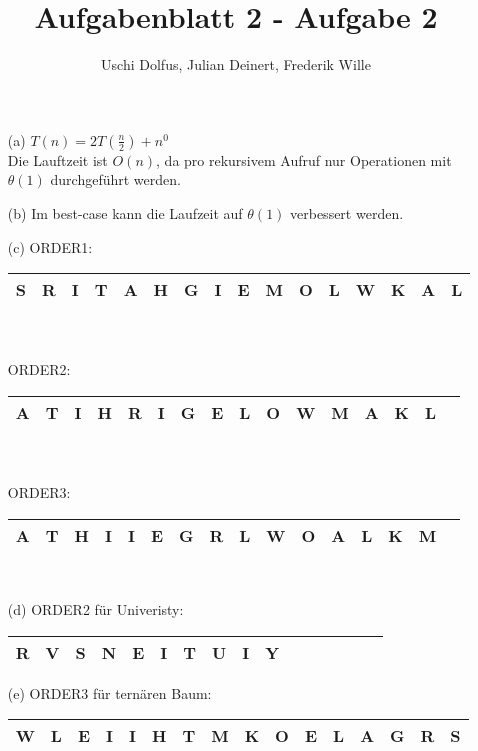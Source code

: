 \documentclass{article}
\title{Aufgabenblatt 2 - Aufgabe 2}
\author{Uschi Dolfus, Julian Deinert, Frederik Wille}
\begin{document}
\maketitle

\begin{enumerate}
\item[(a)]
$T(n) = 2T\left(\frac{n}{2}\right)+n^0$\\
Die Lauftzeit ist $O(n)$, da pro rekursivem Aufruf nur Operationen mit $\theta\left(1\right)$ durchgeführt werden.
\item[(b)]
Im best-case kann die Laufzeit auf $\theta\left(1\right)$ verbessert werden.
\item[(c)]
ORDER1:
\begin{tabular}{|c|c|c|c|c|c|c|c|c|c|c|c|c|c|c|c|}
	\hline S & R & I & T & A & H & G & I & E & M & O & L & W & K & A & L \\
	\hline
\end{tabular}\\
\\
ORDER2:
\begin{tabular}{|c|c|c|c|c|c|c|c|c|c|c|c|c|c|c|c|}
	\hline A & T & I & H & R & I & G & E & L & O & W & M & A & K & L \\
	\hline
\end{tabular}\\
\\
ORDER3:
\begin{tabular}{|c|c|c|c|c|c|c|c|c|c|c|c|c|c|c|c|}
	\hline A & T & H & I & I & E & G & R & L & W & O & A & L & K & M \\
	\hline
\end{tabular}\\
\item[(d)]
ORDER2 für Univeristy:
\begin{tabular}{|c|c|c|c|c|c|c|c|c|c|c|c|c|c|c|c|}
	\hline R & V & S & N & E & I & T & U & I & Y \\
	\hline
\end{tabular}
\item[(e)]
ORDER3 für ternären Baum: \\
\begin{tabular}{|c|c|c|c|c|c|c|c|c|c|c|c|c|c|c|c|}
	\hline W & L & E & I & I & H & T & M & K & O & E & L & A & G & R & S \\
	\hline
\end{tabular}\\
\end{enumerate}
\end{document}
